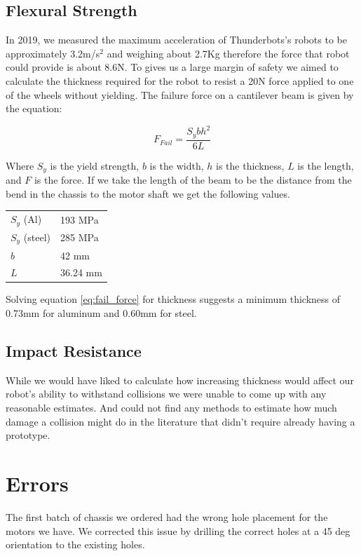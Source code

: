 \documentclass{iopart}
\begin{document}
\subsection{Flexural Strength}
In 2019, we measured the maximum acceleration of Thunderbots's robots to be approximately 3.2m/s$^2$ and weighing about 2.7Kg therefore the force that robot could provide is about 8.6N. To gives us a large margin of safety we aimed to calculate the thickness required for the robot to resist a 20N force applied to one of the wheels without yielding. The failure force on a cantilever beam is given by the equation:

\begin{center}
    \begin{equation}
        F_{Fail} = \frac{S_ybh^2}{6L}
        \label{eq:fail_force}
    \end{equation}
\end{center}

Where $S_y$ is the yield strength, $b$ is the width, $h$ is the thickness, $L$ is the length, and $F$ is the force. If we take the length of the beam to be the distance from the bend in the chassis to the motor shaft we get the following values.
\begin{center}
    \begin{tabular}{l|l}
        $S_y$ (Al) & 193 MPa\\
        $S_y$ (steel) & 285 MPa\\
        $b$ & 42 mm \\
        $L$ & 36.24 mm
    \end{tabular}
\end{center}

Solving equation \ref{eq:fail_force} for thickness suggests a minimum thickness of 0.73mm for aluminum and 0.60mm for steel.

\subsection{Impact Resistance}
While we would have liked to calculate how increasing thickness would affect our robot's ability to withstand collisions we were unable to come up with any reasonable estimates. And could not find any methods to estimate how much damage a collision might do in the literature that didn't require already having a prototype.

\section{Errors}
The first batch of chassis we ordered had the wrong hole placement for the motors we have. We corrected this issue by drilling the correct holes at a 45 deg orientation to the existing holes.
\end{document}
